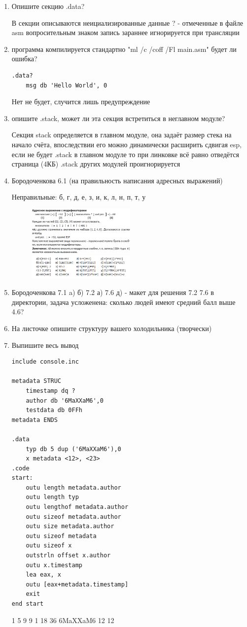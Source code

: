 \documentclass[a4paper,10pt]{article}
\begin{document}
\begin{enumerate}
    \item Опишите секцию .data? \par
В секции описываются неициализированные данные ? - отмеченные в файле asm вопросительным знаком запись зараннее игнорируется при трансляции\\
    \item программа компилируется стандартно "ml /c /coff /Fl main.asm" будет ли ошибка?
\begin{verbatim}
.data?
    msg db 'Hello World', 0
\end{verbatim}
Нет не будет, случится лишь предупреждение \\
    \item опишите .stack, может ли эта секция встретиться в неглавном модуле? \par
Секция stack определяется в главном модуле, она задаёт размер стека на начало счёта, впоследствии его можно динамически расширить сдвигая esp, если не будет .stack в главном модуле то при линковке всё равно отведётся страница (4КБ) .stack других модулей проигнорируется
    \item Бородоченкова 6.1 (на правильность написания адресных выражений) \par
    Неправильные: б, г, д, е, з, и, к, л, н, п, т, у \par
    \begin{figure}[htbp]
        \includegraphics[width=0.5\textwidth]{скрин с бородаченковой.png}
        \includegraphics[width=0.5\textwidth]{скрин задачи.png}
    \end{figure}
    \item Бородоченкова 7.1 a) б) 7.2 а) 7.6 д) - макет для решения 7.2 7.6 в директории, задача усложенена: сколько людей имеют средний балл выше 4.6?
    \item На листочке опишите структуру вашего холодильника (творчески)
    \item Выпишите весь вывод
\begin{verbatim}
include console.inc

metadata STRUC
    timestamp dq ?
    author db '6MaXXaM6',0
    testdata db 0FFh
metadata ENDS

.data
    typ db 5 dup ('6MaXXaM6'),0
    x metadata <12>, <23>
.code
start: 
    outu length metadata.author
    outu length typ
    outu lengthof metadata.author
    outu sizeof metadata.author
    outu size metadata.author
    outu sizeof metadata
    outu sizeof x
    outstrln offset x.author
    outu x.timestamp
    lea eax, x
    outu [eax+metadata.timestamp]
    exit
end start
\end{verbatim}
1 5 9 9 1 18 36 6MaXXaM6 12 12
\end{enumerate}
\end{document}
